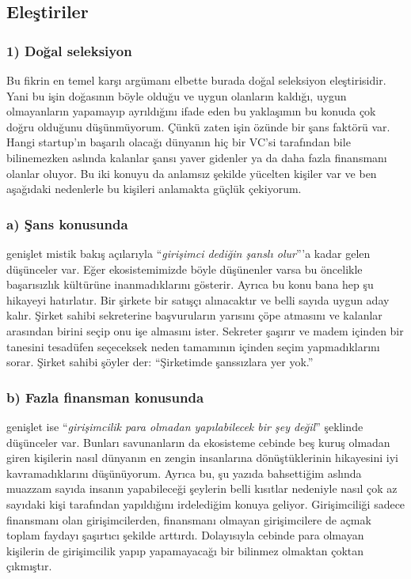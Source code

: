 \documentclass[
]{article}
\begin{document}
\hypertarget{eleux15ftiriler}{%
\subsection{Eleştiriler}\label{eleux15ftiriler}}

\hypertarget{doux11fal-seleksiyon}{%
\subsubsection{1) Doğal seleksiyon}\label{doux11fal-seleksiyon}}

Bu fikrin en temel karşı argümanı elbette burada doğal seleksiyon
eleştirisidir. Yani bu işin doğasının böyle olduğu ve uygun olanların
kaldığı, uygun olmayanların yapamayıp ayrıldığını ifade eden bu
yaklaşımın bu konuda çok doğru olduğunu düşünmüyorum. Çünkü zaten işin
özünde bir şans faktörü var. Hangi startup'ın başarılı olacağı dünyanın
hiç bir VC'si tarafından bile bilinemezken aslında kalanlar şansı yaver
gidenler ya da daha fazla finansmanı olanlar oluyor. Bu iki konuyu da
anlamsız şekilde yücelten kişiler var ve ben aşağıdaki nedenlerle bu
kişileri anlamakta güçlük çekiyorum.

\hypertarget{a-ux15fans-konusunda}{%
\subsubsection{a) Şans konusunda}\label{a-ux15fans-konusunda}}

genişlet mistik bakış açılarıyla ``\emph{girişimci dediğin şanslı
olur}'''a kadar gelen düşünceler var. Eğer ekosistemimizde böyle
düşünenler varsa bu öncelikle başarısızlık kültürüne inanmadıklarını
gösterir. Ayrıca bu konu bana hep şu hikayeyi hatırlatır. Bir şirkete
bir satışçı alınacaktır ve belli sayıda uygun aday kalır. Şirket sahibi
sekreterine başvuruların yarısını çöpe atmasını ve kalanlar arasından
birini seçip onu işe almasını ister. Sekreter şaşırır ve madem içinden
bir tanesini tesadüfen seçeceksek neden tamamının içinden seçim
yapmadıklarını sorar. Şirket sahibi şöyler der: ``Şirketimde şanssızlara
yer yok.''

\hypertarget{b-fazla-finansman-konusunda}{%
\subsubsection{b) Fazla finansman
konusunda}\label{b-fazla-finansman-konusunda}}

genişlet ise ``\emph{girişimcilik para olmadan yapılabilecek bir şey
değil}'' şeklinde düşünceler var. Bunları savunanların da ekosisteme
cebinde beş kuruş olmadan giren kişilerin nasıl dünyanın en zengin
insanlarına dönüştüklerinin hikayesini iyi kavramadıklarını düşünüyorum.
Ayrıca bu, şu yazıda bahsettiğim aslında muazzam sayıda insanın
yapabileceği şeylerin belli kısıtlar nedeniyle nasıl çok az sayıdaki
kişi tarafından yapıldığını irdelediğim konuya geliyor. Girişimciliği
sadece finansmanı olan girişimcilerden, finansmanı olmayan girişimcilere
de açmak toplam faydayı şaşırtıcı şekilde arttırdı. Dolayısıyla cebinde
para olmayan kişilerin de girişimcilik yapıp yapamayacağı bir bilinmez
olmaktan çoktan çıkmıştır.
\end{document}
